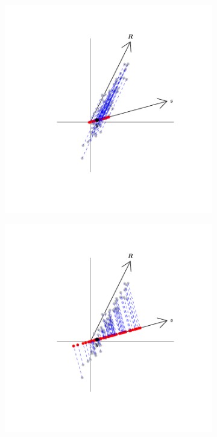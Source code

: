 \documentclass[12pt]{article}
\theoremstyle{definition}
\theoremstyle{property}
\begin{document}
\begin{figure}[!h]
\begin{subfigure}[!h]{0.48\textwidth}
        \caption{}
    \end{subfigure}
    \begin{subfigure}[!h]{0.48\textwidth}
        \includegraphics[width=\textwidth]{Figs/ObliqProj_George.pdf}
        \caption{}
    \end{subfigure}
    \begin{subfigure}[!h]{0.48\textwidth}
        \includegraphics[width=\textwidth]{Figs/OrthProj_George.pdf}

\end{subfigure}
\end{figure}
\end{document}
